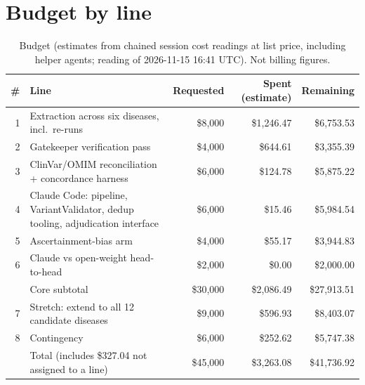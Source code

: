 \documentclass{article} %
\begin{document}
\section{Budget by line}
\label{app:budget}
\begin{table}[!htbp]
\caption{Budget (estimates from chained session cost readings at list price, including helper agents; reading of 2026-11-15 16:41 UTC). Not billing figures.}
\begin{center}
\scriptsize
\begin{tabular}{rlrrr}
\toprule
\# & Line & Requested & Spent (estimate) & Remaining \\
\midrule
1 & Extraction across six diseases, incl.\ re-runs & \$8,000 & \$1,246.47 & \$6,753.53 \\
2 & Gatekeeper verification pass & \$4,000 & \$644.61 & \$3,355.39 \\
3 & ClinVar/OMIM reconciliation + concordance harness & \$6,000 & \$124.78 & \$5,875.22 \\
4 & Claude Code: pipeline, VariantValidator, dedup tooling, adjudication interface & \$6,000 & \$15.46 & \$5,984.54 \\
5 & Ascertainment-bias arm & \$4,000 & \$55.17 & \$3,944.83 \\
6 & Claude vs open-weight head-to-head & \$2,000 & \$0.00 & \$2,000.00 \\
 & Core subtotal & \$30,000 & \$2,086.49 & \$27,913.51 \\
7 & Stretch: extend to all 12 candidate diseases & \$9,000 & \$596.93 & \$8,403.07 \\
8 & Contingency & \$6,000 & \$252.62 & \$5,747.38 \\
 & Total (includes \$327.04 not assigned to a line) & \$45,000 & \$3,263.08 & \$41,736.92 \\
\bottomrule
\end{tabular}
\end{center}
\end{table}
\end{document}
